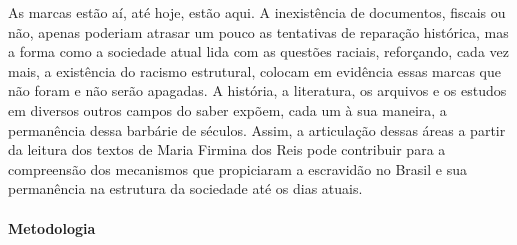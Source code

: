\documentclass[12pt]{extarticle}
\begin{document}
As marcas estão aí, até hoje, estão aqui. A inexistência de documentos,
fiscais ou não, apenas poderiam atrasar um pouco as tentativas de
reparação histórica, mas a forma como a sociedade atual lida com as
questões raciais, reforçando, cada vez mais, a existência do racismo
estrutural, colocam em evidência essas marcas que não foram e não serão
apagadas. A história, a literatura, os arquivos e os estudos em diversos
outros campos do saber expõem, cada um à sua maneira, a permanência
dessa barbárie de séculos. Assim, a articulação dessas áreas a partir da
leitura dos textos de Maria Firmina dos Reis pode contribuir para a
compreensão dos mecanismos que propiciaram a escravidão no Brasil e sua
permanência na estrutura da sociedade até os dias atuais.

\paragraph{Metodologia}
\end{document}
